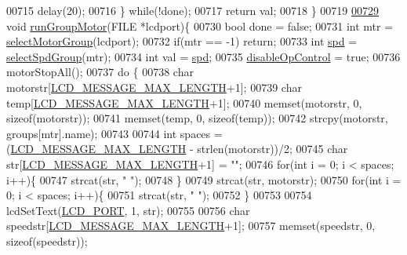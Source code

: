 \begin{DoxyCode}
{{{{{{{{{{{00715         delay(20);
00716     \} \textcolor{keywordflow}{while}(!done);
00717     \textcolor{keywordflow}{return} val;
00718 \}
00719 
\hypertarget{lcddiag_8c_source.tex_l00729}{}\hyperlink{lcddiag_8c_a61bf99fda231c065d2113f0c67b8d72a}{00729} \textcolor{keywordtype}{void} \hyperlink{lcddiag_8c_a61bf99fda231c065d2113f0c67b8d72a}{runGroupMotor}(FILE *lcdport)\{
00730     \textcolor{keywordtype}{bool} done = \textcolor{keyword}{false};
00731     \textcolor{keywordtype}{int} mtr = \hyperlink{lcddiag_8c_a45205137e2aea6d387568cabe3072002}{selectMotorGroup}(lcdport);
00732     \textcolor{keywordflow}{if}(mtr == -1) \textcolor{keywordflow}{return};
00733     \textcolor{keywordtype}{int} \hyperlink{opcontrol_8c_a642ce334330c8b0f6e33dd0a3fa65111}{spd} = \hyperlink{lcddiag_8c_a7a421f9cf3e21c806080bee51c68a5c9}{selectSpdGroup}(mtr);
00734     \textcolor{keywordtype}{int} val = \hyperlink{opcontrol_8c_a642ce334330c8b0f6e33dd0a3fa65111}{spd};
00735     \hyperlink{lcddiag_8c_a0f0b335cd078d025d6fb720eb3bf6437}{disableOpControl} = \textcolor{keyword}{true};
00736     motorStopAll();
00737     \textcolor{keywordflow}{do} \{
00738         \textcolor{keywordtype}{char} motorstr[\hyperlink{lcdmsg_8h_abe4c4b70fc6f44ae3680e5b2c68cdd00}{LCD\_MESSAGE\_MAX\_LENGTH}+1];
00739         \textcolor{keywordtype}{char} temp[\hyperlink{lcdmsg_8h_abe4c4b70fc6f44ae3680e5b2c68cdd00}{LCD\_MESSAGE\_MAX\_LENGTH}+1];
00740         memset(motorstr, 0, \textcolor{keyword}{sizeof}(motorstr));
00741         memset(temp, 0, \textcolor{keyword}{sizeof}(temp));
00742         strcpy(motorstr, groups[mtr].name);
00743 
00744         \textcolor{keywordtype}{int} spaces = (\hyperlink{lcdmsg_8h_abe4c4b70fc6f44ae3680e5b2c68cdd00}{LCD\_MESSAGE\_MAX\_LENGTH} - strlen(motorstr))/2;
00745         \textcolor{keywordtype}{char} str[\hyperlink{lcdmsg_8h_abe4c4b70fc6f44ae3680e5b2c68cdd00}{LCD\_MESSAGE\_MAX\_LENGTH}+1] = \textcolor{stringliteral}{""};
00746         \textcolor{keywordflow}{for}(\textcolor{keywordtype}{int} i = 0; i < spaces; i++)\{
00747             strcat(str, \textcolor{stringliteral}{" "});
00748         \}
00749         strcat(str, motorstr);
00750         \textcolor{keywordflow}{for}(\textcolor{keywordtype}{int} i = 0; i < spaces; i++)\{
00751             strcat(str, \textcolor{stringliteral}{" "});
00752         \}
00753 
00754         lcdSetText(\hyperlink{lcdmsg_8h_abcf42bd88b3c36193f301ca25b033875}{LCD\_PORT}, 1, str);
00755 
00756         \textcolor{keywordtype}{char} speedstr[\hyperlink{lcdmsg_8h_abe4c4b70fc6f44ae3680e5b2c68cdd00}{LCD\_MESSAGE\_MAX\_LENGTH}+1];
00757         memset(speedstr, 0, \textcolor{keyword}{sizeof}(speedstr));
}}}}}}}}}}}
\end{DoxyCode}
